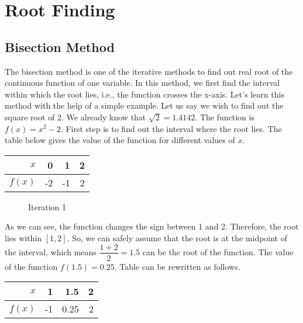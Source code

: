\documentclass[]{book}
\begin{document}
\title{}
\author{Jigar Sura}
\date{}
\maketitle
\chapter{Root Finding}
\section{Bisection Method}
The bisection method is one of the iterative methods to find out real root of the continuous function of one variable. In this method, we first find the interval within which the root lies, i.e., the function crosses the x-axis. Let's learn this method with the help of a simple example. Let us say we wish to find out the square root of 2. We already know that $\sqrt{2} = 1.4142$. The function is $f(x) = x^{2}-2$. First step is to find out the interval where the root lies. The table below gives the value of the function for different values of $x$. 
\begin{center}
\begin{tabular}{|r|r|r|r|}
\hline
$x$ & 0 & 1 & 2\\
\hline
$f(x)$ & -2 & -1 & 2\\
\hline
\end{tabular}
\end{center}
\begin{figure}
\begin{center}
\end{center}
\caption{Iteration 1}
\label{it1}
\end{figure}
As we can see, the function changes the sign between 1 and 2. Therefore, the root lies within $[1,2]$. So, we can safely assume that the root is at the midpoint of the interval, which means $\dfrac{1+2}{2} = 1.5$ can be the root of the function. The value of the function $f(1.5) = 0.25$. Table can be rewritten as follows.
\begin{center}
\begin{tabular}{|r|r|r|r|}
\hline
$x$ & 1 & 1.5 & 2\\
\hline
$f(x)$ & -1 & 0.25 & 2\\
\hline
\end{tabular}
\end{center}
\end{document}
